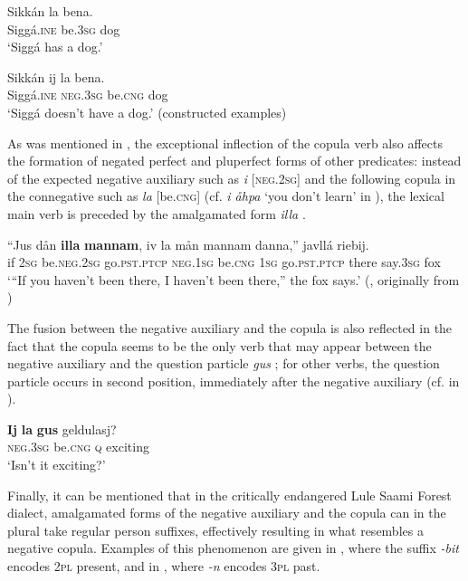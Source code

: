\documentclass[output=paper,colorlinks,citecolor=brown]{langscibook}
\begin{document}
\ea\label{ex:lul:21}
    \ea\label{ex:lul:21a}
        \gll Sikkán la bena.  \\ 
             Siggá\textsc{.ine} be.\textsc{3sg} dog  \\
        \glt ‘Siggá has a dog.’
    
    \ex\label{ex:lul:21b}
        \gll Sikkán ij la bena. \\ 
             Siggá\textsc{.ine} \textsc{neg.3sg} be.\textsc{cng} dog \\
        \glt ‘Siggá doesn’t have a dog.’  (constructed examples)
    \z
\z 

As was mentioned in , the exceptional inflection of the copula verb also affects the formation of negated perfect and pluperfect forms of other predicates: instead of the expected negative auxiliary such as \textit{i} [\textsc{neg.2sg}] and the following copula in the connegative such as \textit{la} [be.\textsc{cng}] (cf. \textit{i åhpa} ‘you don’t learn’ in ), the lexical main verb is preceded by the amalgamated form \textit{illa} .

\ea\label{ex:lul:22} 
    \gll “Jus dån \textbf{illa} \textbf{mannam}, {iv} {la} mån {mannam} danna,” javllá riebij.\\ 
         if \textsc{2sg} be.\textsc{neg.2sg} go.\textsc{pst.ptcp} \textsc{neg.1sg} be.\textsc{cng} \textsc{1sg} go.\textsc{pst.ptcp} there say.\textsc{3sg} fox\\
    \glt ‘“If you haven’t been there, I haven’t been there,” the fox says.’ (\citealt{SIKOR2021}, originally from \citealt[472]{Qvigstad1929})
\z 

The fusion between the negative auxiliary and the copula is also reflected in the fact that the copula seems to be the only verb that may appear between the negative auxiliary and the question particle \textit{gus} ; for other verbs, the question particle occurs in second position, immediately after the negative auxiliary (cf.  in ).

\ea\label{ex:lul:23} 
    \gll \textbf{Ij} \textbf{la} \textbf{gus} geldulasj? \\ 
         \textsc{neg.3sg} be.\textsc{cng} \textsc{q} exciting \\
    \glt  ‘Isn’t it exciting?’ \citep{SIKOR2021}
\z 

Finally, it can be mentioned that in the critically endangered Lule Saami Forest dialect, amalgamated forms of the negative auxiliary and the copula can in the plural take regular person suffixes, effectively resulting in what resembles a negative copula. Examples of this phenomenon are given in , where the suffix \textit{{}-bit} encodes \textsc{2pl} present, and in , where \textit{{}-n} encodes \textsc{3pl} past.
\end{document}
